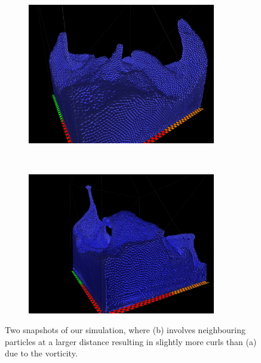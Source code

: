 \begin{figure}[H]
\centering
\begin{subfigure}{.9\textwidth}
  \centering
  \includegraphics[width=0.9\textwidth]{img/55296_edit.png}
  \caption{}
\end{subfigure}%
\\
\begin{subfigure}{.9\textwidth}
  \centering
  \includegraphics[width=0.9\textwidth]{img/3Nieghbours_55size.png}
  \caption{}
\end{subfigure}%

\caption{Two snapshots of our simulation, where (b) involves neighbouring particles at a larger distance resulting in slightly more curls than (a) due to the vorticity.}
\label{fig:result}
\end{figure}

\newpage

